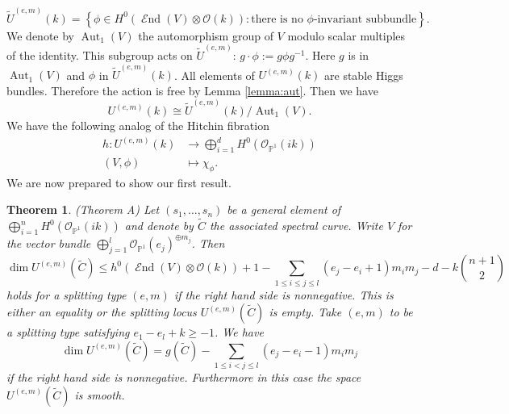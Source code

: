 \documentclass[12pt]{extarticle}
\newtheorem{theorem}{Theorem}
\theoremstyle{definition}
\numberwithin{theorem}{section}
\newcommand{\PP}{\mathbb{P}}
\newcommand{\OO}{\mathcal{O}}
\newcommand{\op}{\operatorname}
\DeclareMathOperator{\End}{\mathcal{E}nd}
\renewcommand{\tilde}{\widetilde}		%
\begin{document}
\begin{equation*}
\tilde{U}^{(e,m)} (k)= \left\{ \phi \in H^0(\End(V) \otimes \OO(k)) : \text{there is no $\phi$-invariant subbundle}\right\}.
\end{equation*} 
We denote by $\op{Aut}_1(V)$ the automorphism group of $V$ modulo scalar multiples of the identity. This subgroup acts on $\tilde{U}^{(e,m)}$: $g \cdot \phi := g\phi g^{-1}$. 
Here $g$ is in $\op{Aut}_1(V)$ and $\phi $ in $\tilde{U}^{(e,m)}(k)$. All elements of $U^{(e,m)}(k)$ are stable Higgs bundles. Therefore the action is free by Lemma \ref{lemma:aut}. Then we have
\begin{equation*}
U^{(e,m)}(k) \cong \tilde{U}^{(e,m)}(k)/\op{Aut}_1(V). 
\end{equation*}
We have the following analog of the Hitchin fibration 
\begin{align*}
h: U^{(e,m)}(k) &\rightarrow \bigoplus_{i=1}^d H^0(\OO_{\PP^1}(ik))\\
(V,\phi) &\mapsto \chi_{\phi}.
\end{align*}
We are now prepared to show our first result.
\begin{theorem}(Theorem A)
Let $(s_1,\ldots,s_n)$ be a general element of $\bigoplus_{i=1}^n H^0(\OO_{\PP^1}(ik))$ and denote by $\tilde{C}$ the associated spectral curve. Write $V$ for the vector bundle $\bigoplus_{j=1}^l \OO_{\PP^1}(e_j)^{\oplus m_j}$.
Then 
\begin{equation}\label{eq:dim_bn_loci}
	\dim U^{(e,m)}(\tilde{C}) \leq h^0(\End(V) \otimes \OO(k)) + 1-  \sum_{1\leq i \leq j \leq l}(e_j - e_i+1)m_im_j - d - k\binom{n+1}{2}
\end{equation}
holds for a splitting type $(e,m)$ if the right hand side is nonnegative. This is either an equality or the splitting locus $U^{(e,m)}(\tilde{C})$ is empty.
Take $(e,m)$ to be a splitting type satisfying $e_1 - e_l + k\geq -1$.   We have
\begin{equation}\label{eq:dim_split_loci}
	\dim U^{(e,m)}(\tilde{C}) = g(\tilde{C}) - \sum_{1 \leq i < j\leq l}(e_j - e_i -1 )m_im_j 
\end{equation}
if the right hand side is nonnegative.
Furthermore in this case the space $U^{(e,m)}(\tilde{C})$ is smooth.
\end{theorem}
\end{document}
